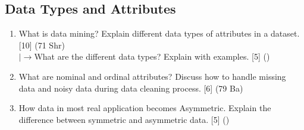 \documentclass[12pt]{article}
\newcommand{\lb}{\\$\left|\rightarrow\right.$}
\begin{document}
  \subsection{Data Types and Attributes}
    \begin{enumerate}[topsep=0pt, noitemsep]
      \item What is data mining? Explain different data types of attributes in a dataset. \hfill [10] (71 Shr)
        \lb What are the different data types? Explain with examples. \hfill [5] ()

      \item What are nominal and ordinal attributes? Discuss how to handle missing data and noisy data during data cleaning process. \hfill [6] (79 Ba)

      \item How data in most real application becomes Asymmetric. Explain the difference between symmetric and asymmetric data. \hfill [5] ()
    \end{enumerate}
\end{document}
